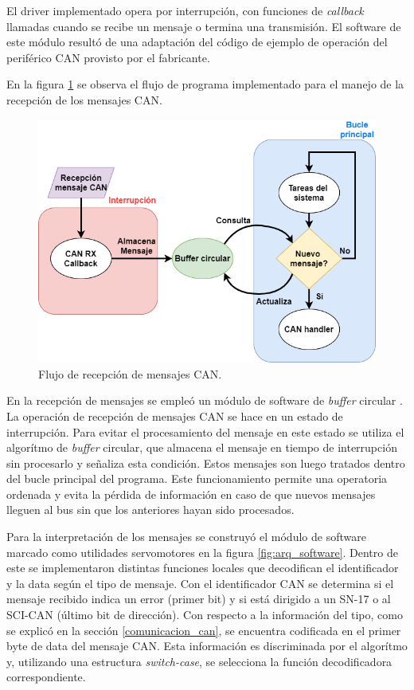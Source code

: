 El driver implementado opera por interrupción, con funciones de \textit{callback} llamadas cuando se recibe un mensaje o termina una transmisión. El software de este módulo resultó de una adaptación del código de ejemplo de operación del periférico CAN provisto por el fabricante.

En la figura \ref{fig:can_handler} se observa el flujo de programa implementado para el manejo de la recepción de los mensajes CAN.

\begin{figure}[htbp]
	\centering
	\includegraphics[scale=.5]{./Figures/Can_handler.png}
	\caption{Flujo de recepción de mensajes CAN.}
	\label{fig:can_handler}
\end{figure}

En la recepción de mensajes se empleó un módulo de software de \textit{buffer} circular \citep{tpf_gabriel}. La operación de recepción de mensajes CAN se hace en un estado de interrupción. Para evitar el procesamiento del mensaje en este estado se utiliza el algorítmo de \textit{buffer} circular, que almacena el mensaje en tiempo de interrupción sin procesarlo y señaliza esta condición. Estos mensajes son luego tratados dentro del bucle principal del programa. Este funcionamiento permite una operatoria ordenada y evita la pérdida de información en caso de que nuevos mensajes lleguen al bus sin que los anteriores hayan sido procesados.

Para la interpretación de los mensajes se construyó el módulo de software marcado como utilidades servomotores en la figura \ref{fig:arq_software}. Dentro de este se implementaron distintas funciones locales que decodifican el identificador y la data según el tipo de mensaje. Con el identificador CAN se determina si el mensaje recibido indica un error (primer bit) y si está dirigido a un SN-17 o al SCI-CAN (último bit de dirección). Con respecto a la información del tipo, como se explicó en la sección \ref{comunicacion_can}, se encuentra codificada en el primer byte de data del mensaje CAN. Esta información es discriminada por el algorítmo y, utilizando una estructura \textit{switch-case}, se selecciona la función decodificadora correspondiente.


